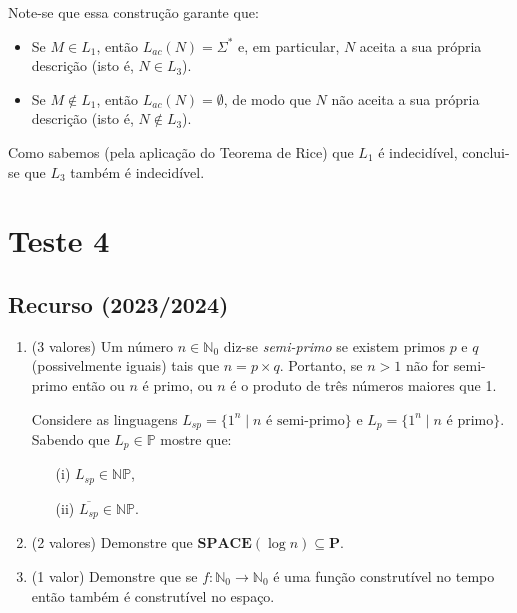 \documentclass[a4paper,12pt]{article}
\begin{document}
\begin{enumerate}[label=\alph*)]
  Note-se que essa construção garante que:
  \begin{itemize}
    \item Se $M \in L_1$, então $L_{ac}(N)=\Sigma^*$ e, em particular, $N$ aceita a sua própria descrição (isto é, $N \in L_3$).
    \item Se $M \notin L_1$, então $L_{ac}(N)=\emptyset$, de modo que $N$ não aceita a sua própria descrição (isto é, $N \notin L_3$).
  \end{itemize}

  Como sabemos (pela aplicação do Teorema de Rice) que $L_1$ é indecidível, conclui-se que $L_3$ também é indecidível.

\end{enumerate}

\vspace{1.0cm}
\section*{Teste 4}

\subsection*{Recurso (2023/2024)}
\begin{enumerate}[label=\alph*)]
  \item (3 valores) Um número \( n \in \mathbb{N}_0 \) diz-se \textit{semi-primo} se existem primos \( p \) e \( q \) (possivelmente iguais) tais que \( n = p \times q \). Portanto, se \( n > 1 \) não for semi-primo então ou \( n \) é primo, ou \( n \) é o produto de três números maiores que 1.

  Considere as linguagens \( L_{sp} = \{1^n \mid n \text{ é semi-primo}\} \) e \( L_p = \{1^n \mid n \text{ é primo}\} \). Sabendo que \( L_p \in \mathbb{P} \) mostre que:
  \begin{enumerate}
      \item[(i)] \( L_{sp} \in \mathbb{NP} \),
      \item[(ii)] \( \overline{L_{sp}} \in \mathbb{NP} \).
  \end{enumerate}
  
  \item (2 valores) Demonstre que \( \textbf{SPACE}(\log n) \subseteq \textbf{P} \).
  
  \item (1 valor) Demonstre que se $f : \mathbb{N}_0 \to \mathbb{N}_0$ é uma função construtível no tempo então também é construtível no espaço.
\end{enumerate}
\end{document}
